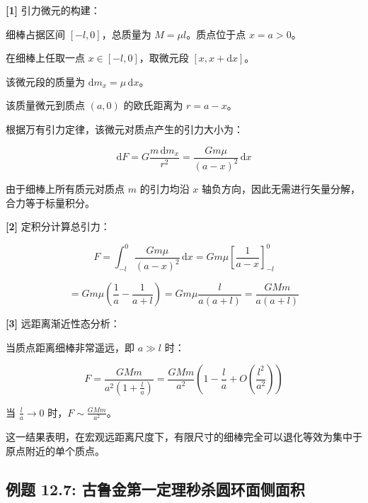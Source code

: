 \documentclass[11pt,a4paper,UTF8]{ctexart}
\begin{document}
\begin{solbox}[分步推导与答题规范]
\textbf{[1]} 引力微元的构建：

细棒占据区间 $[-l, 0]$，总质量为 $M = \mu l$。质点位于点 $x = a > 0$。

在细棒上任取一点 $x \in [-l, 0]$，取微元段 $[x, x + \mathrm{d}x]$。

该微元段的质量为 $\mathrm{d}m_x = \mu\,\mathrm{d}x$。

该质量微元到质点 $(a, 0)$ 的欧氏距离为 $r = a - x$。

根据万有引力定律，该微元对质点产生的引力大小为：


\begin{equation*}
\mathrm{d}F = G \frac{m\,\mathrm{d}m_x}{r^2} = \frac{G m \mu}{(a - x)^2}\,\mathrm{d}x
\end{equation*}


由于细棒上所有质元对质点 $m$ 的引力均沿 $x$ 轴负方向，因此无需进行矢量分解，合力等于标量积分。

\textbf{[2]} 定积分计算总引力：


\begin{equation*}
F = \int_{-l}^0 \frac{G m \mu}{(a - x)^2}\,\mathrm{d}x = G m \mu \left[\frac{1}{a - x}\right]_{-l}^0
\end{equation*}



\begin{equation*}
= G m \mu \left(\frac{1}{a} - \frac{1}{a + l}\right) = G m \mu \frac{l}{a(a + l)} = \frac{G M m}{a(a + l)}
\end{equation*}


\textbf{[3]} 远距离渐近性态分析：

当质点距离细棒非常遥远，即 $a \gg l$ 时：


\begin{equation*}
F = \frac{G M m}{a^2 \left(1 + \frac{l}{a}\right)} = \frac{G M m}{a^2} \left(1 - \frac{l}{a} + O\left(\frac{l^2}{a^2}\right)\right)
\end{equation*}


当 $\frac{l}{a} \to 0$ 时，$F \sim \frac{G M m}{a^2}$。

这一结果表明，在宏观远距离尺度下，有限尺寸的细棒完全可以退化等效为集中于原点附近的单个质点。
\end{solbox}


\subsection{例题 12.7: 古鲁金第一定理秒杀圆环面侧面积}
\end{document}
